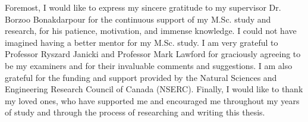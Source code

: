 
Foremost, I would like to express my sincere gratitude to my supervisor Dr. Borzoo Bonakdarpour for the continuous support of my M.Sc. study and research, for his patience, motivation, and immense knowledge. I could not have imagined having a better mentor for my M.Sc. study.
I am very grateful to Professor Ryszard Janicki and Professor Mark Lawford for graciously agreeing to be my examiners and for their invaluable comments and suggestions. I am also grateful for the funding and support provided by the Natural Sciences and Engineering Research Council of Canada (NSERC).
Finally, I would like to thank my loved ones, who have supported me and encouraged me  throughout my years of study and through the process of researching and writing this thesis. 





